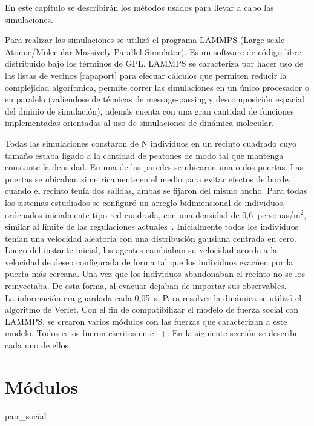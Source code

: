
\noindent En este capítulo se describirán los métodos usados para llevar a cabo las simulaciones. 

\noindent Para realizar las simulaciones se utilizó el programa LAMMPS (Large-scale Atomic/Molecular Massively Parallel Simulator).
Es un software de código libre distribuido bajo los términos de GPL.
LAMMPS se caracteriza por hacer uso de las listas de vecinos [rapaport] para efecuar cálculos que permiten reducir la
complejidad algorítmica, permite correr las simulaciones en un único procesador o en paralelo (valíendose de técnicas de message-passing y descomposición espacial del dminio de simulación), además cuenta con una gran cantidad de funciones implementadas orientadas al uso de simulaciones de dinámica molecular. 

\noindent Todas las simulaciones constaron de N individuos en un recinto cuadrado cuyo tamaño estaba ligado a la cantidad de
peatones de modo tal que mantenga constante la densidad. En una de las paredes se ubicaron una o dos puertas. Las puertas se ubicaban simetricamente en el medio para evitar efectos de borde, cuando el recinto tenía dos salidas, ambas se fijaron del mismo ancho.
Para todas los sistemas estudiados se configuró un arreglo bidimensional de individuos, ordenados inicialmente tipo
red cuadrada, con una densidad de  0,6~personas/m$^2$, similar al límite de las regulaciones actuales~\cite{mysen}. Inicialmente todos los individuos tenían una velocidad aleatoria con una distribución gausiana centrada en cero.  Luego del instante inicial, los agentes cambiaban su velocidad acorde a la velocidad de deseo configurada 
de forma tal que los individuos evacúen por la puerta más cercana. Una vez que los individuos abandonaban el recinto no se los reinyectaba. De esta forma, al evacuar dejaban de importar sus observables. \\
La información era guardada cada 0,05~s. 
Para resolver la dinámica se utilizó el algoritmo de Verlet. 
\noindent Con el fin de compatibilizar el modelo de fuerza social con LAMMPS, se crearon varios módulos con las fuerzas que
caracterizan a este modelo. Todos estos fueron escritos en c++. En la siguiente sección se describe cada uno de ellos. 

\section{Módulos}

{\Large pair\_social}

